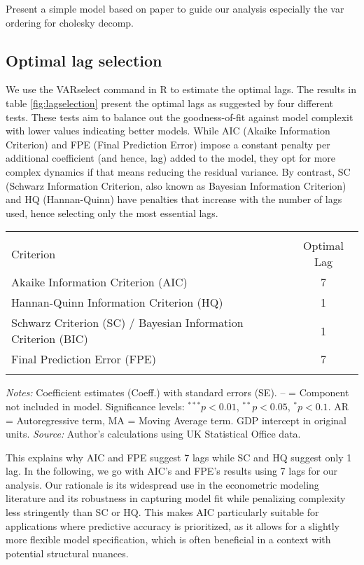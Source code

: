 \documentclass[
]{article}
\let\oldtable\table
\let\endoldtable\endtable
\renewenvironment{table}[1][H]{\oldtable[H]}{\endoldtable}
\begin{document}
Present a simple model based on paper to guide our analysis especially the 
var ordering for cholesky decomp.

\subsection{Optimal lag selection}

We use the VARselect command in R to estimate the optimal lags. The results in 
table \ref{fig:lagselection} present the optimal lags as suggested by four different tests. These
tests aim to balance out the goodness-of-fit against model complexit with lower 
values indicating better models. While AIC 
(Akaike Information Criterion) and FPE (Final Prediction Error) impose a constant
penalty per additional coefficient (and hence, lag) added to the model, they opt
for more complex dynamics if that means reducing the residual variance. 
By contrast, SC (Schwarz Information Criterion, also known as Bayesian Information Criterion) 
and HQ (Hannan-Quinn) have penalties that increase with the number of lags used, 
hence selecting only the most essential lags. 

\begin{table}[ht]
\centering
\begin{threeparttable}
\caption{\textsc{Optimal Lag Selection Based on Information Criteria}}\label{fig:lagselection}
\begin{tabular}{lc}
 \\[-1.8ex]  \hline \hline  \\[-1.8ex] 
{Criterion} & {Optimal Lag} \\
\midrule
 Akaike Information Criterion (AIC) & 7 \\
Hannan-Quinn Information Criterion (HQ)  & 1 \\
Schwarz Criterion (SC) / Bayesian Information Criterion (BIC)  & 1 \\
Final Prediction Error (FPE) & 7 \\
\hline \hline  \\[-1.8ex] 
\end{tabular}
\end{threeparttable}
\begin{minipage}{\textwidth}
\footnotesize
\textit{Notes:} Coefficient estimates (Coeff.) with standard errors (SE). 
{--} = Component not included in model. Significance levels: $^{***}p<0.01$, $^{**}p<0.05$, $^{*}p<0.1$. 
AR = Autoregressive term, MA = Moving Average term. GDP intercept in original units. 
\textit{Source:} Author's calculations using UK Statistical Office data.
\end{minipage}
\end{table}
This explains why AIC and FPE suggest
7 lags while SC and HQ suggest only 1 lag. In the following, we go with AIC’s and 
FPE’s results using 7 lags for our analysis. Our rationale is its widespread 
use in the econometric modeling literature and its 
robustness in capturing model fit while penalizing complexity less stringently 
than SC or HQ. This makes AIC  particularly suitable for applications 
where predictive accuracy is prioritized, as it allows for a slightly more 
flexible model specification, which is often beneficial in a context 
with potential structural nuances.
\end{document}

